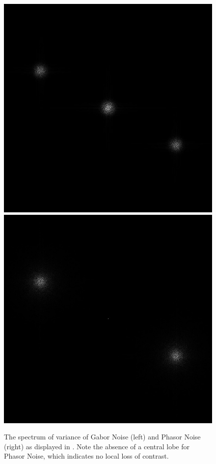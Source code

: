 \documentclass{utue} %
\begin{document}
\begin{figure}[ht]
  \centering
  \includegraphics[width=0.49\linewidth]{images/gaborNoiseSpectrumOfVariance}
  \includegraphics[width=0.49\linewidth]{images/phasorNoiseSpectrumOfVariance}
  \caption{The spectrum of variance of Gabor Noise (left) and Phasor Noise (right) as displayed in \cite{phasorNoise}. Note the absence of a central lobe for Phasor Noise, which indicates no local loss of contrast.}\label{fig:spectrumOfVariance}
\end{figure}
\end{document}
